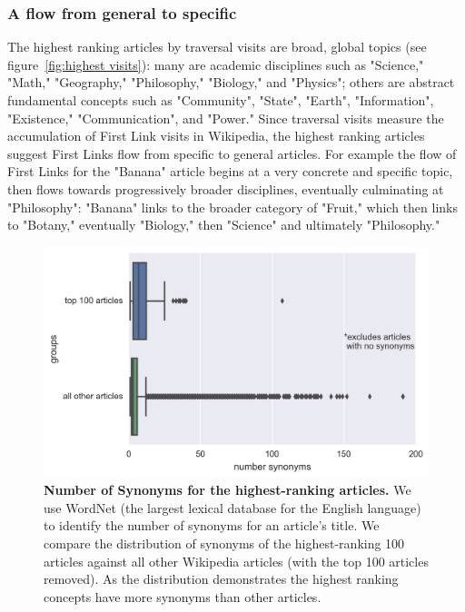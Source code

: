 \documentclass[pre,twocolumn,twoside,superscriptaddress,floatfix, aps, 10pt]{revtex4-1}
\begin{document}
\subsubsection{A flow from general to specific}

The highest ranking articles by traversal visits are 
broad, global topics
(see figure~\ref{fig:highest visits}):
many are academic disciplines such as "Science," "Math," 
"Geography," "Philosophy," "Biology," and "Physics"; others are abstract fundamental concepts such as 
"Community", "State", "Earth", "Information", 
"Existence," "Communication", and "Power."
Since traversal visits measure the accumulation of First Link visits in Wikipedia, 
the highest ranking articles suggest First Links flow from specific to general articles. 
For example the flow of First Links for the "Banana" article begins at a very concrete
and specific topic, then flows towards progressively broader disciplines, eventually 
culminating at "Philosophy": "Banana" links to the broader category of "Fruit," which then links to 
"Botany," eventually "Biology," then "Science" and ultimately "Philosophy." 


\begin{figure}[tp!]
  \centering	
  \includegraphics[width=\columnwidth]{graphics/synonyms.png}
  \caption{
    \textbf{Number of Synonyms for the highest-ranking articles.}
    We use WordNet (the largest lexical database for the English language)
    to identify the number of synonyms for an article's title. We compare 
    the distribution of synonyms of the highest-ranking 100 articles
    against all other Wikipedia articles (with the top 100 articles removed). As the distribution demonstrates
    the highest ranking concepts have more synonyms than other articles.
  }
  \label{fig:synonyms}
\end{figure}
\end{document}
